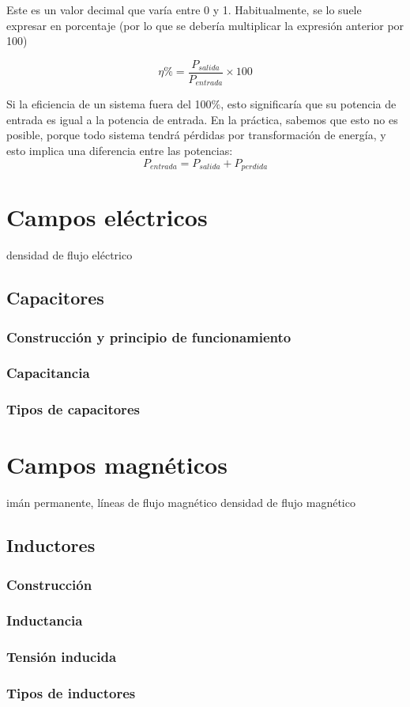 Este es un valor decimal que varía entre 0 y 1. Habitualmente, se lo suele expresar en porcentaje (por lo que se debería multiplicar la expresión anterior por 100)

\begin{equation}
	\label{eq:efiporc}
	\eta \% = \frac{P_{salida}}{P_{entrada}} \times 100
\end{equation}

Si la eficiencia de un sistema fuera del 100$\%$, esto significaría que su potencia de entrada es igual a la potencia de entrada. En la práctica, sabemos que esto no es posible, porque todo sistema tendrá pérdidas por transformación de energía, y esto implica una diferencia entre las potencias: $$ P_{entrada} = P_{salida} + P_{perdida} $$ 

\section{Campos eléctricos}
densidad de flujo eléctrico
\subsection{Capacitores}
\subsubsection{Construcción y principio de funcionamiento}
\subsubsection{Capacitancia}
\subsubsection{Tipos de capacitores}
\section{Campos magnéticos}
imán permanente, líneas de flujo magnético
densidad de flujo magnético
\subsection{Inductores}
\subsubsection{Construcción}
\subsubsection{Inductancia}
\subsubsection{Tensión inducida}
\subsubsection{Tipos de inductores}
